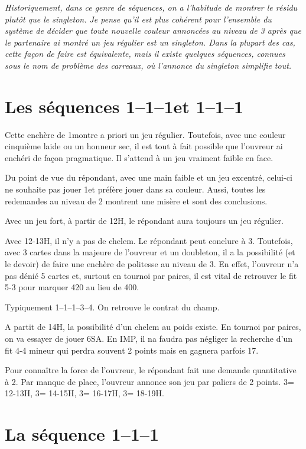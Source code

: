 \documentclass[a4paper,12pt, french]{article}
\newcommand{\T}{\Cl}
\newcommand{\K}{\Di}
\newcommand{\C}{\He}
\renewcommand{\P}{\Sp}
\begin{document}
\textit{Historiquement, dans ce genre de séquences, on a l'habitude de montrer le résidu plutôt que le singleton. Je pense qu'il est plus cohérent pour l'ensemble du système de décider que toute nouvelle couleur annoncées au niveau de 3 après que le partenaire ai montré un jeu régulier est un singleton. Dans la plupart des cas, cette façon de faire est équivalente, mais il existe quelques séquences, connues sous le nom de problème des carreaux, où l'annonce du singleton simplifie tout.}

\section{Les séquences 1\T--1\P--1\NT et 1\K--1\P--1\NT}

Cette enchère de 1\NT montre a priori un jeu régulier. Toutefois, avec une couleur cinquième laide ou un honneur sec, il est tout à fait possible que l'ouvreur ai enchéri de façon pragmatique. Il s'attend à un jeu vraiment faible en face.

Du point de vue du répondant, avec une main faible et un jeu excentré, celui-ci ne souhaite pas jouer 1\NT et préfère jouer dans sa couleur. Aussi, toutes les redemandes au niveau de 2 montrent une misère et sont des conclusions.

Avec un jeu fort, à partir de 12H, le répondant aura toujours un jeu régulier. 

Avec 12-13H, il n'y a pas de chelem. Le répondant peut conclure à 3\NT. Toutefois, avec 3 cartes dans la majeure de l'ouvreur et un doubleton, il a la possibilité (et le devoir) de faire une enchère de politesse au niveau de 3. En effet, l'ouvreur n'a pas dénié 5 cartes et, surtout en tournoi par paires, il est vital de retrouver le fit 5-3 pour marquer 420 au lieu de 400.

Typiquement 1\T--1\P--1\NT--3\C--4\C. On retrouve le contrat du champ.

A partit de 14H, la possibilité d'un chelem au poids existe. En tournoi par paires, on va essayer de jouer 6SA. En IMP, il na faudra pas négliger la recherche d'un  fit 4-4 mineur qui perdra souvent 2 points mais en gagnera parfois 17.

Pour connaître la force de l'ouvreur, le répondant fait une demande quantitative à 2\NT. Par manque de place, l'ouvreur annonce son jeu par paliers de 2 points. 3\T = 12-13H, 3\K = 14-15H, 3\C = 16-17H, 3\P = 18-19H.

\section{La séquence 1\C--1\P--1\NT}
\end{document}
